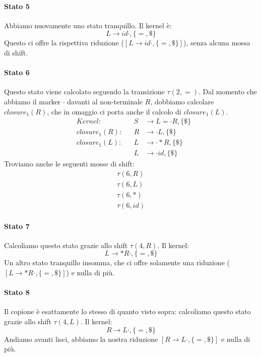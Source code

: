 \documentclass[class=book, crop=false, oneside, 12pt]{standalone}
\begin{document}
\paragraph{Stato 5}
Abbiamo nuovamente uno stato tranquillo. Il kernel è:
\begin{equation*}
    L \to id \cdot, \{=, \$\}
\end{equation*}
Questo ci offre la rispettiva riduzione (\([L \to id \cdot, \{=, \$\}]\)), senza alcuna mossa di shift.

\paragraph{Stato 6}
Questo stato viene calcolato seguendo la transizione \(\tau(2, =)\). Dal momento che abbiamo il marker \(\cdot\) davanti al non-terminale \(R\), dobbiamo calcolare \(closure_1(R)\), che in omaggio ci porta anche il calcolo di \(closure_1(L)\).
\begin{align*}
    &&Kernel: &&S &\to L = \cdot R, \{\$\}& \\
    &&closure_1(R): &&R &\to \cdot L, \{\$\} &\\
    &&closure_1(L): &&L &\to \cdot \ast R, \{\$\}&\\
    && &&L &\to \cdot id,  \{\$\}&
\end{align*}
Troviamo anche le seguenti mosse di shift:
\begin{gather*}
    \tau(6, R) \\
    \tau(6, L) \\
    \tau(6, \ast) \\
    \tau(6, id)
\end{gather*}

\paragraph{Stato 7}
Calcoliamo questo stato grazie allo shift \(\tau(4, R)\). Il kernel:
\begin{equation*}
    L \to \ast R \cdot, \{=, \$\}
\end{equation*}
Un altro stato tranquillo insomma, che ci offre solamente una riduzione (\([L \to \ast R \cdot, \{=, \$\}]\)) e nulla di più. 

\paragraph{Stato 8}
Il copione è esattamente lo stesso di quanto visto sopra: calcoliamo questo stato grazie allo shift \(\tau(4, L)\). Il kernel:
\begin{equation*}
    R \to L \cdot, \{=, \$\}
\end{equation*}
Andiamo avanti lisci, abbiamo la nostra riduzione \([R \to L \cdot, \{=, \$\}]\) e nulla di più.
\end{document}
